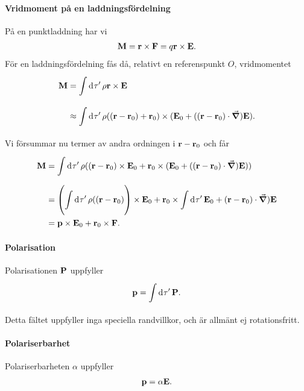 \paragraph{Vridmoment på en laddningsfördelning}
På en punktladdning har vi
\begin{align*}
	\vb{M} = \vb{r}\times\vb{F} = q\vb{r}\times\vb{E}.
\end{align*}
För en laddningsfördelning fås då, relativt en referenspunkt $O$, vridmomentet
\begin{align*}
	\vb{M} &= \int\limits_{}^{}\dd[]{\tau'}\rho\vb{r}\times\vb{E} \\
	       &\approx \int\limits_{}^{}\dd[]{\tau'}\rho((\vb{r} - \vb{r}_{0}) + \vb{r}_{0})\times(\vb{E}_{0} + ((\vb{r} - \vb{r}_{0})\cdot\grad)\vb{E}).
\end{align*}
Vi försummar nu termer av andra ordningen i $\vb{r} - \vb{r}_{0}$ och får
\begin{align*}
	\vb{M} &= \int\limits_{}^{}\dd[]{\tau'}\rho((\vb{r} - \vb{r}_{0})\times\vb{E}_{0} + \vb{r}_{0}\times(\vb{E}_{0} + ((\vb{r} - \vb{r}_{0})\cdot\grad)\vb{E})) \\
	       &= \left(\int\limits_{}^{}\dd[]{\tau'}\rho((\vb{r} - \vb{r}_{0})\right)\times\vb{E}_{0} + \vb{r}_{0}\times\int\limits_{}^{}\dd[]{\tau'}\vb{E}_{0} + (\vb{r} - \vb{r}_{0})\cdot\grad)\vb{E} \\
	       &= \vb{p}\times\vb{E}_{0} + \vb{r}_{0}\times\vb{F}.
\end{align*}

\paragraph{Polarisation}
Polarisationen $\vb{P}$ uppfyller
\begin{align*}
	\vb{p} = \int\limits_{}^{}\dd[]{\tau'}\vb{P}.
\end{align*}
Detta fältet uppfyller inga speciella randvillkor, och är allmänt ej rotationsfritt.

\paragraph{Polariserbarhet}
Polariserbarheten $\alpha$ uppfyller
\begin{align*}
	\vb{p} = \alpha\vb{E}.
\end{align*}

